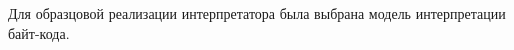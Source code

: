\clearpage
{}\label{bc}

Для образцовой реализации интерпретатора была выбрана модель интерпретации
байт-кода.

